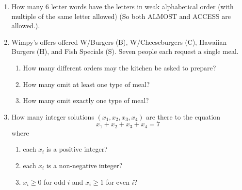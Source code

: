 \documentclass[10pt, a4paper]{article}
\begin{document}
\begin{example}
    \begin{enumerate}[label = E\arabic*]
        \item 
        How many $6$ letter words have the letters in weak alphabetical order (with multiple of the same letter allowed) (So both ALMOST and ACCESS are allowed.).
        \item
        Wimpy's offers offered W/Burgers (B), W/Cheeseburgers (C), Hawaiian Burgers (H), and Fish Specials (S).
        Seven people each request a single meal.
        \begin{enumerate}[label = (\alph*)]
            \item How many different orders may the kitchen be asked to prepare?
            \item How many omit at least one type of meal?
            \item How many omit exactly one type of meal?
        \end{enumerate}
        \item How many integer solutions $(x_1, x_2, x_3, x_4)$ are there to the equation
        \[
        x_1 + x_2 + x_3 + x_4 = 7
        \]
        where
        \begin{enumerate}[label = (\alph*)]
            \item each $x_i$ is a positive integer?
            \item each $x_i$ is a non-negative integer?
            \item $x_i \geq 0$ for odd $i$ and $x_i \geq 1$ for even $i$?
        \end{enumerate}
    \end{enumerate}


\end{example}
\end{document}
